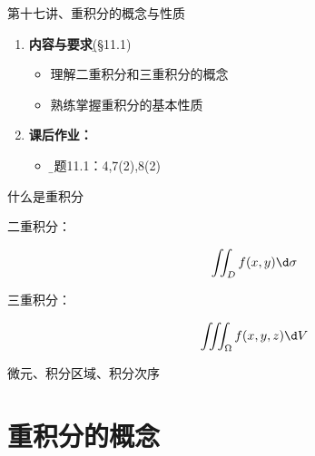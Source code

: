 
\begin{frame}{第十七讲、重积分的概念与性质}
	\linespread{1.5}
	\begin{enumerate}
	  \item {\bf 内容与要求}{\b (\S11.1)}
	  \begin{itemize}
	    \item 理解二重积分和三重积分的概念
	    \item 熟练掌握重积分的基本性质
	  \vspace{1em}
	  \end{itemize}
	  \item {\bf  课后作业：}
	  \begin{itemize}
	    \item {\b 习题11.1：4,7(2),8(2)}
	  \end{itemize}
	\end{enumerate}
\end{frame}

\begin{frame}{什么是重积分}
	\linespread{1.2}\pause 
	\pause 
	
	\bigskip
	\begin{description}
	\item[{\bb 二重积分：}]\pause 
		$$\iint_Df(x,y)\d\sigma$$\pause 
	\item[{\bb 三重积分：}]\pause 
		$$\iiint_{\Omega}f(x,y,z)\d V$$\pause 
	\end{description}
	\pause \alert{微元、\pause 积分区域、\pause 积分次序}
\end{frame}

\section{重积分的概念}


